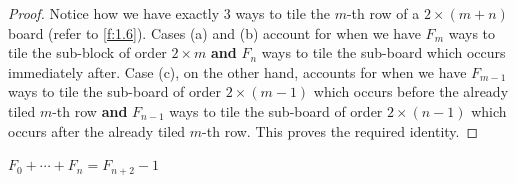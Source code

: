 \begin{proof}
Notice how we have exactly $3$ ways to tile the $m$-th row of a $2\times \left( m+n \right)$ board (refer to \cref{f:1.6}). Cases (a) and (b) account for when we have $F_{m}$ ways to tile the sub-block of order $2\times m$ \textbf{and} $F_{n}$ ways to tile the sub-board which occurs immediately after. Case (c), on the other hand, accounts for when we have $F_{m-1}$ ways to tile the sub-board of order $2\times \left( m-1 \right)$ which occurs before the already tiled $m$-th row  \textbf{and} $F_{n-1}$ ways to tile the sub-board of order $2\times \left( n-1 \right)$ which occurs after the already tiled $m$-th row. This proves the required identity.
\end{proof}

\begin{claim}
	$F_{0}+\cdots+F_{n} = F_{n+2}-1$
\end{claim}

